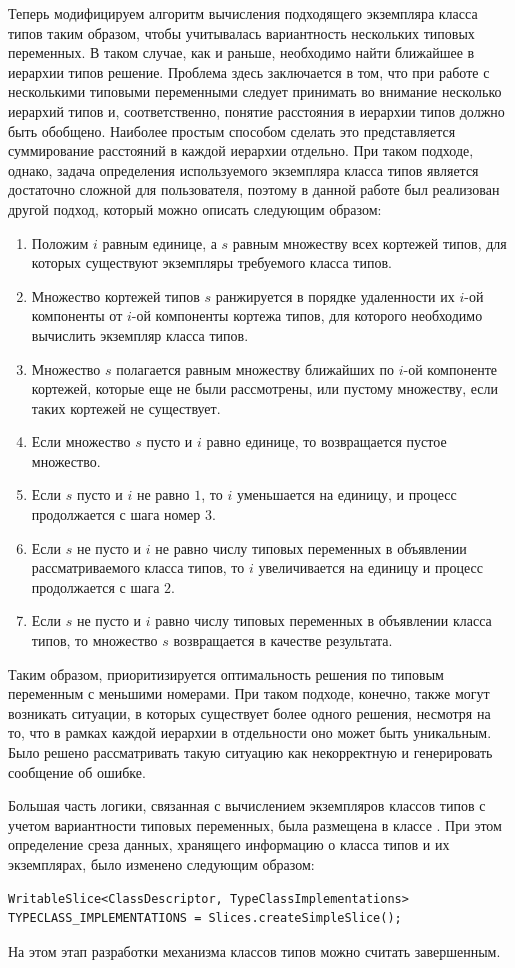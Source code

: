 Теперь модифицируем алгоритм вычисления подходящего экземпляра класса типов таким образом, чтобы учитывалась вариантность нескольких типовых переменных. В таком случае, как и раньше, необходимо найти ближайшее в иерархии типов решение. Проблема здесь заключается в том, что при работе с несколькими типовыми переменными следует принимать во внимание несколько иерархий типов и, соответственно, понятие расстояния в иерархии типов должно быть обобщено. Наиболее простым способом сделать это представляется суммирование расстояний в каждой иерархии отдельно. При таком подходе, однако, задача определения используемого экземпляра класса типов является достаточно сложной для пользователя, поэтому в данной работе был реализован другой подход, который можно описать следующим образом:
\begin{enumerate}
    \item Положим $i$ равным единице, а $s$ равным множеству всех кортежей типов, для которых существуют экземпляры требуемого класса типов.
    \item Множество кортежей типов $s$ ранжируется в порядке удаленности их $i$-ой компоненты от $i$-ой компоненты кортежа типов, для которого необходимо вычислить экземпляр класса типов. 
    \item Множество $s$ полагается равным множеству ближайших по $i$-ой компоненте кортежей, которые еще не были рассмотрены, или пустому множеству, если таких кортежей не существует.
    \item Если множество $s$ пусто и $i$ равно единице, то возвращается пустое множество. 
    \item Если $s$ пусто и $i$ не равно $1$, то $i$ уменьшается на единицу, и процесс продолжается с шага номер $3$. 
    \item Если $s$ не пусто и $i$ не равно числу типовых переменных в объявлении рассматриваемого класса типов, то $i$ увеличивается на единицу и процесс продолжается с шага $2$.
    \item Если $s$ не пусто и $i$ равно числу типовых переменных в объявлении класса типов, то множество $s$ возвращается в качестве результата. 
\end{enumerate}
Таким образом, приоритизируется оптимальность решения по типовым переменным с меньшими номерами. При таком подходе, конечно, также могут возникать ситуации, в которых существует более одного решения, несмотря на то, что в рамках каждой иерархии в отдельности оно может быть уникальным. Было решено рассматривать такую ситуацию как некорректную и генерировать сообщение об ошибке. 

Большая часть логики, связанная с вычислением экземпляров классов типов с учетом вариантности типовых переменных, была размещена в классе . При этом определение среза данных, хранящего информацию о класса типов и их экземплярах, было изменено следующим образом:
\begin{lstlisting}[style={wo_caption}]
WritableSlice<ClassDescriptor, TypeClassImplementations> 
TYPECLASS_IMPLEMENTATIONS = Slices.createSimpleSlice();
\end{lstlisting}

На этом этап разработки механизма классов типов можно считать завершенным.